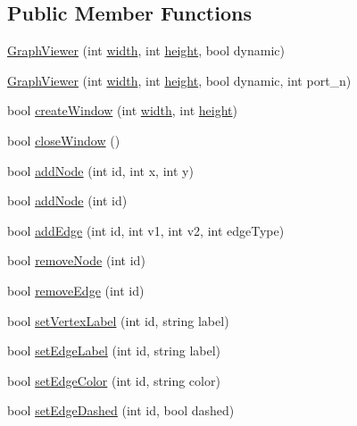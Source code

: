 \subsection*{Public Member Functions}
\begin{DoxyCompactItemize}
\item 
\hyperlink{classGraphViewer_a8adc614f4fc290a3efcec7d7ceb1c58a}{Graph\+Viewer} (int \hyperlink{classGraphViewer_a5de27a1d20968b8494cd4bf5a4eb27e1}{width}, int \hyperlink{classGraphViewer_a9a1000e492a66ac4301c7135275690da}{height}, bool dynamic)
\item 
\hyperlink{classGraphViewer_ad9d7b1d8b4ba8ef18517eae0e68568a2}{Graph\+Viewer} (int \hyperlink{classGraphViewer_a5de27a1d20968b8494cd4bf5a4eb27e1}{width}, int \hyperlink{classGraphViewer_a9a1000e492a66ac4301c7135275690da}{height}, bool dynamic, int port\+\_\+n)
\item 
bool \hyperlink{classGraphViewer_ae5247dc66449dcd21fc5d531bbbaddfa}{create\+Window} (int \hyperlink{classGraphViewer_a5de27a1d20968b8494cd4bf5a4eb27e1}{width}, int \hyperlink{classGraphViewer_a9a1000e492a66ac4301c7135275690da}{height})
\item 
bool \hyperlink{classGraphViewer_a85990c1eaac7feed3950960d4bd2fd4c}{close\+Window} ()
\item 
bool \hyperlink{classGraphViewer_a5421e86ac76433876309236ba96e70a2}{add\+Node} (int id, int x, int y)
\item 
bool \hyperlink{classGraphViewer_ab9be856eb5f45284719a3bb119ec01ea}{add\+Node} (int id)
\item 
bool \hyperlink{classGraphViewer_aad0c1448c37f744209ffb671f1bd0015}{add\+Edge} (int id, int v1, int v2, int edge\+Type)
\item 
bool \hyperlink{classGraphViewer_a0c418639bb911eb827cabf895915f775}{remove\+Node} (int id)
\item 
bool \hyperlink{classGraphViewer_a9a8ee68c7c12b373affbe4069dd95d72}{remove\+Edge} (int id)
\item 
bool \hyperlink{classGraphViewer_ac25d7d007022fda16799808ba136e909}{set\+Vertex\+Label} (int id, string label)
\item 
bool \hyperlink{classGraphViewer_a447cca0064e785654c2105602c2961ca}{set\+Edge\+Label} (int id, string label)
\item 
bool \hyperlink{classGraphViewer_a07ccc96707efae4aa5f3ced3dca015af}{set\+Edge\+Color} (int id, string color)
\item 
bool \hyperlink{classGraphViewer_a1698f1c6b3a8e7cabc7b7d7cf42fc7f0}{set\+Edge\+Dashed} (int id, bool dashed)

\end{DoxyCompactItemize}
